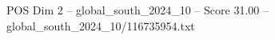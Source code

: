 \begin{textsample}{POS Dim 2 – global\_south\_2024\_10 – Score 31.00 – global\_south\_2024\_10/116735954.txt}
\end{textsample}

